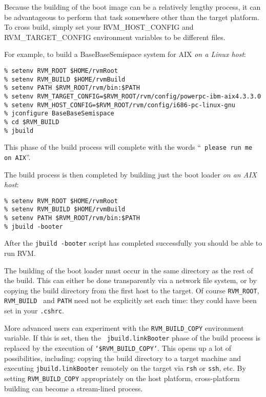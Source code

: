 Because the building of the boot image can be a relatively lengthy
process, it can be advantageous to perform that task somewhere other
than the target platform.  To cross build, simply set your
RVM\_HOST\_CONFIG and RVM\_TARGET\_CONFIG environment variables to
be different files.

For example, to build a BaseBaseSemispace system for AIX\AIXTMFootnote
{\em on a Linux host}:
\begin{verbatim}
% setenv RVM_ROOT $HOME/rvmRoot
% setenv RVM_BUILD $HOME/rvmBuild
% setenv PATH $RVM_ROOT/rvm/bin:$PATH
% setenv RVM_TARGET_CONFIG=$RVM_ROOT/rvm/config/powerpc-ibm-aix4.3.3.0
% setenv RVM_HOST_CONFIG=$RVM_ROOT/rvm/config/i686-pc-linux-gnu
% jconfigure BaseBaseSemispace
% cd $RVM_BUILD
% jbuild
\end{verbatim}

This phase of the build process will complete with the words ``{\tt
  please run me on AIX}''.


The build process is then completed by building just the boot loader {\em
  on an AIX host}:

\begin{verbatim}
% setenv RVM_ROOT $HOME/rvmRoot
% setenv RVM_BUILD $HOME/rvmBuild
% setenv PATH $RVM_ROOT/rvm/bin:$PATH
% jbuild -booter
\end{verbatim}

After the {\tt jbuild -booter} script has completed successfully you should be able 
to run RVM. 

The building of the boot loader must occur in the same directory as
the rest of the build.  This can either be done transparently via a
network file system, or by copying the build directory from the first
host to the target.  Of course {\tt RVM\_ROOT}, {\tt RVM\_BUILD }
and {\tt PATH} need not be explicitly set each time: they could have
been set in your {\tt .cshrc}.

More advanced users can experiment with the {\tt RVM\_BUILD\_COPY}
environment variable.  If this is set, then the {\tt
  jbuild.linkBooter} phase of the build process is replaced by the
execution of {\tt `\$RVM\_BUILD\_COPY`}.  This opens up a lot of
possibilities, including: copying the build directory to a target
machine and executing {\tt jbuild.linkBooter} remotely on the target
via {\tt rsh} or {\tt ssh}, etc.  By setting {\tt RVM\_BUILD\_COPY}
appropriately on the host platform, cross-platform building can become
a stream-lined process.

\JikesTMFooter

